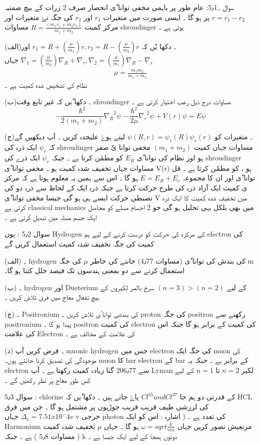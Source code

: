 \documentclass{book}
\begin{document}
سوال ۔5٫1:
عام طور پر  باہمی مخفی توانا ٗی انحصار صرف 2 زرات کے بیچ صمتیہ
$ r = r_1 - r_2 $
پر ہو گا ۔ ایسی صورت میں متغیرات 
$ r_1  $
اور 
$  r_2  $
کی جگہ نےٗ متغیرات  اور مرکز کمیت
$  R = \frac{ ( m_1 r_1 + m_2 r_2 ) }{ m_1 + m_2 } $
مساوات shroudinger ہوتی ہے ۔ 


(الف)۔  دکھا یٗں کہ 
$ r_1 = R + (\frac{ \mu}{m_1} )r , r_2 = R - (\frac{ \mu }{ m_2 } )r   $ 
اور 
$ \nabla_1 = ( \frac{ \mu }{ m_2 } )\nabla_R + \nabla_r , \nabla_2 = ( \frac{ \mu }{ m_1 } ) \nabla_R - \nabla_r $ 
جہاں 
\begin{align}
\mu = \frac{ m_1 m_2 }{ m_1 + m_2 }
\end{align}
نظام کی تشخیص شدہ کمیت ہے ۔
 
(ب)۔ دکھا ٗیں کہ غیر تابع وقت shroudinger  مساوات درج ذیل رعب اختیار کرتی ہے ۔
\[
- \frac{ \hbar^2 }{ 2 ( m_1 + m_2 ) } { \nabla_R }^2  \psi - \frac{ \hbar^2 }{ 2 \mu } { \nabla_r }^2 { \psi } + V(r) \psi = E \psi
\]

(ج)۔ متغیرات کو 
$ \psi ( R , r ) = { \psi_r }(R) { \psi_r } (r) $
لیتے ہوےٗ علیحدہ کریں ۔ آپ دیکھیں گے کہ 
$ \psi_r $
 ایک ذرہ کی shroudinger مساوات جہاں کمیت 
$ ( m_1 + m_2 ) $
مخفی توانا یٗ صفر ہو اور نظام کی توانا ٗی 
$ E_R $
کو مطمٰن کرتا ہے ۔ جبکہ 
$ \psi_r $
ایک ذرے کی shroudinger مساوات جہاں تخفیف شدہ کمیت ہو ۔  مخفی توانا ٗی  V(r) ہو ، کو مطمٗن کرتا ہے ۔ قل توانا ٗی اور ان کا مجموعہ 
$ E = E_R + E_r $
ہو گا ۔ اس سے ہمیں یہ معلوم ہوتا ہے  کہ مرکز ی کمیت ایک آزاد ذرہ کی طرح حرکت کرتا ہے جبکہ ذرہ ایک کے لحاظ سے ذرہ دو کی  نصبطی حرکت ایسے ہی ہو گی جیسا مخفی توانا ٗی V میں تخفیف شدہ کمیت کا ایک ذرہ  کرتی ہے classical mechanics میں بھی بلکل یہی تحلیل ہو گی    جو 2 اجسام مسلے کو محاصل ایک جسم مسلہ میں  تبدیل کرتی ہے ۔ 

\newpage 

سوال 5٫2 : یوں Hydrogen کے مرکزہ کی حرکت کو درست کرنے کے لیے ہم electron  کی کمیت کی جگہ تخفیف شدہ کمیت استعمال کریں گے 

(الف) ۔ hydrogen کی بندش کی توانا ٗی (مساوات 4٫77) جاننے کی خاطر 
$ \mu $
کی جگہ m استعمال کرنے سے  دو بمعنی ہندسوں تک فیصد خلل کتنا ہو گا۔  

(ب) ۔ hydrogen اور Dueterium کے لیے 
$ ( n=3 ) > ( n=2 ) $ 
 سرخ بالمر لکیروں کے بیچ تفعال معاج میں فرق تلاش کریں ۔ 

(ج) ۔ Positronium کی بندشی توانا ٗی تلاش کریں ۔ proton کی جگہ  positron رکھنے سے positronium پیدا ہو گا ۔ positron کی کمیت electron کی کمیت کے برابر ہو گا جبکہ اس کی علامت Electron کی علامت کے مخالف ہے ۔ 

(د) ۔ فرض کریں آپ muonic hydrogen  جس میں electron کی جگہ ایک muon کی موجودگی کی تصدیق کرنا جانتے ہوں۔ muon کا bar  electron کے bar  کے برابر ہے ۔ جبکہ یہ electron سے 206٫77 گنا زیادہ  کمیت رکھتا ہے ۔  آپ Lyman \alpha لکیر  
$ n = 2 $
تا 
$ n = 1 $
کے لیے کس طور معاج پر نظر رکھیں گے ۔ 

سوال 5٫3 : chlorine کے قدرتی دو ہم جا 
$ Cl^35 and Cl^37 $ 
پاےٗ جاتے ہیں ۔ دکھا ٗیں کہ HCL کی لرزشی طیف قریب قریب   جوڑیوں پر مشتمل ہو گا ۔ جن میں فرق 
$ \Delta_v = 7.51 x {10}^-4 v $
جہاں v خرجی photon کی تعدد ہے ۔  ( اشارہ : اس کو ایک Harmonium مرتعیش تصور کریں جہاں 
$ \omega = sqrt{ \frac{ k }{ mu} } $
ہو گا ۔ جہاں 
$ \mu $
تؒخفیف شدہ کمیت ( مساوات 5٫8 ) ہے ۔ جبکہ k دونوں ہمجا کے لیے ایک جیسا ہے ۔ 
\end{document}

